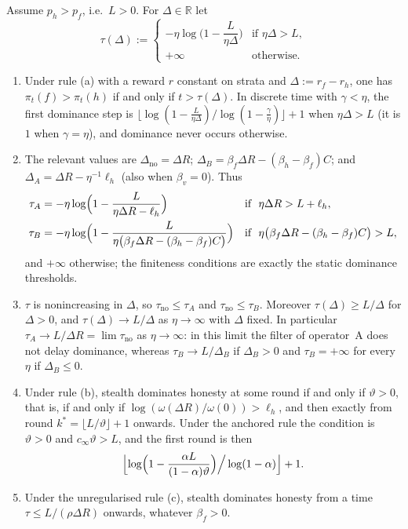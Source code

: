 \begin{corollary}\label{cor:hitting-times}
Assume $p_h>p_f$, i.e.\ $L>0$. For $\Delta\in\mathbb R$ let
\[
\tau(\Delta):=\begin{cases}
-\eta\log\bigl(1-\dfrac{L}{\eta\Delta}\bigr) & \text{if }\eta\Delta>L,\\[1.5ex]
+\infty & \text{otherwise.}
\end{cases}
\]
\begin{enumerate}
\item[\textup{(i)}] Under rule \textup{(a)} with a reward $r$ constant on
strata and $\Delta:=r_f-r_h$, one has $\pi_t(f)>\pi_t(h)$ if and only if
$t>\tau(\Delta)$. In discrete time with $\gamma<\eta$, the first dominance
step is
$\bigl\lfloor\log(1-\tfrac{L}{\eta\Delta})/\log(1-\tfrac{\gamma}{\eta})\bigr\rfloor+1$
when $\eta\Delta>L$ (it is $1$ when $\gamma=\eta$), and dominance never
occurs otherwise.
\item[\textup{(ii)}] The relevant values are
$\Delta_{\mathrm{no}}=\Delta R$;
$\Delta_B=\beta_f\Delta R-(\beta_h-\beta_f)C$; and
$\Delta_A=\Delta R-\eta^{-1}\ell_h$ (also when $\beta_v=0$). Thus
\begin{align*}
\tau_A&=-\eta\log\Bigl(1-\frac{L}{\eta\Delta R-\ell_h}\Bigr)
&&\text{if }\ \eta\Delta R>L+\ell_h,\\
\tau_B&=-\eta\log\Bigl(1-\frac{L}{\eta\bigl(\beta_f\Delta R-(\beta_h-\beta_f)C\bigr)}\Bigr)
&&\text{if }\ \eta\bigl(\beta_f\Delta R-(\beta_h-\beta_f)C\bigr)>L,
\end{align*}
and $+\infty$ otherwise; the finiteness conditions are exactly the static
dominance thresholds.
\item[\textup{(iii)}] $\tau$ is nonincreasing in $\Delta$, so
$\tau_{\mathrm{no}}\le\tau_A$ and $\tau_{\mathrm{no}}\le\tau_B$. Moreover
$\tau(\Delta)\ge L/\Delta$ for $\Delta>0$, and
$\tau(\Delta)\to L/\Delta$ as $\eta\to\infty$ with $\Delta$ fixed. In
particular $\tau_A\to L/\Delta R=\lim\tau_{\mathrm{no}}$ as
$\eta\to\infty$: in this limit the filter of operator~A does not delay
dominance, whereas $\tau_B\to L/\Delta_B$ if $\Delta_B>0$ and
$\tau_B=+\infty$ for every $\eta$ if $\Delta_B\le0$.
\item[\textup{(iv)}] Under rule \textup{(b)}, stealth dominates honesty at
some round if and only if $\vartheta>0$, that is, if and only if
$\log(\omega(\Delta R)/\omega(0))>\ell_h$, and then exactly from
round $k^\ast=\lfloor L/\vartheta\rfloor+1$ onwards. Under the anchored rule
the condition is $\vartheta>0$ and $c_\infty\vartheta>L$, and the first
round is then
\[
\Bigl\lfloor\log\Bigl(1-\frac{\alpha L}{(1-\alpha)\vartheta}\Bigr)\Big/\log(1-\alpha)\Bigr\rfloor+1 .
\]
\item[\textup{(v)}] Under the unregularised rule \textup{(c)}, stealth
dominates honesty from a time $\tau\le L/(\rho\Delta R)$ onwards, whatever
$\beta_f>0$.
\end{enumerate}
\end{corollary}

